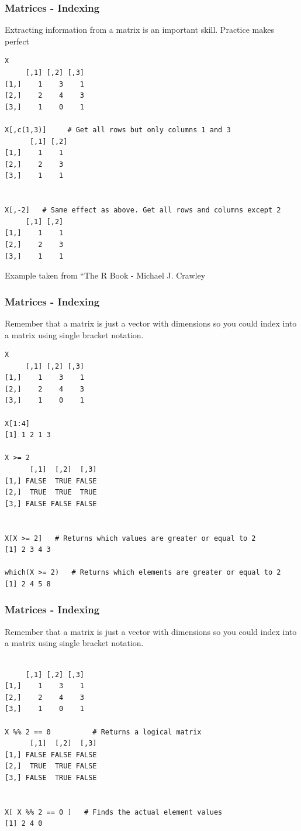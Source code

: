 \documentclass{beamer}
\begin{document}
\begin{frame}[fragile]
\frametitle{Matrices - Indexing}
Extracting information from a matrix is an important skill. Practice makes perfect
\scriptsize
\begin{verbatim}
X
     [,1] [,2] [,3]
[1,]    1    3    1
[2,]    2    4    3
[3,]    1    0    1

X[,c(1,3)]     # Get all rows but only columns 1 and 3
      [,1] [,2]
[1,]    1    1
[2,]    2    3
[3,]    1    1


X[,-2]   # Same effect as above. Get all rows and columns except 2
     [,1] [,2]
[1,]    1    1
[2,]    2    3
[3,]    1    1
\end{verbatim}
\scriptsize
Example taken from ``The R Book - Michael J. Crawley
\end{frame}


\begin{frame}[fragile]
\frametitle{Matrices - Indexing}
Remember that a matrix is just a vector with dimensions so you could index into a matrix using single bracket notation.
\scriptsize
\begin{verbatim}
X
     [,1] [,2] [,3]
[1,]    1    3    1
[2,]    2    4    3
[3,]    1    0    1

X[1:4]
[1] 1 2 1 3

X >= 2
      [,1]  [,2]  [,3]
[1,] FALSE  TRUE FALSE
[2,]  TRUE  TRUE  TRUE
[3,] FALSE FALSE FALSE


X[X >= 2]   # Returns which values are greater or equal to 2
[1] 2 3 4 3

which(X >= 2)   # Returns which elements are greater or equal to 2
[1] 2 4 5 8
\end{verbatim}
\end{frame}

\begin{frame}[fragile]
\frametitle{Matrices - Indexing}
Remember that a matrix is just a vector with dimensions so you could index into a matrix using single bracket notation.
\footnotesize
\begin{verbatim}

     [,1] [,2] [,3]
[1,]    1    3    1
[2,]    2    4    3
[3,]    1    0    1

X %% 2 == 0          # Returns a logical matrix
      [,1]  [,2]  [,3]
[1,] FALSE FALSE FALSE
[2,]  TRUE  TRUE FALSE
[3,] FALSE  TRUE FALSE


X[ X %% 2 == 0 ]   # Finds the actual element values
[1] 2 4 0


\end{verbatim}
\end{frame}
\end{document}
